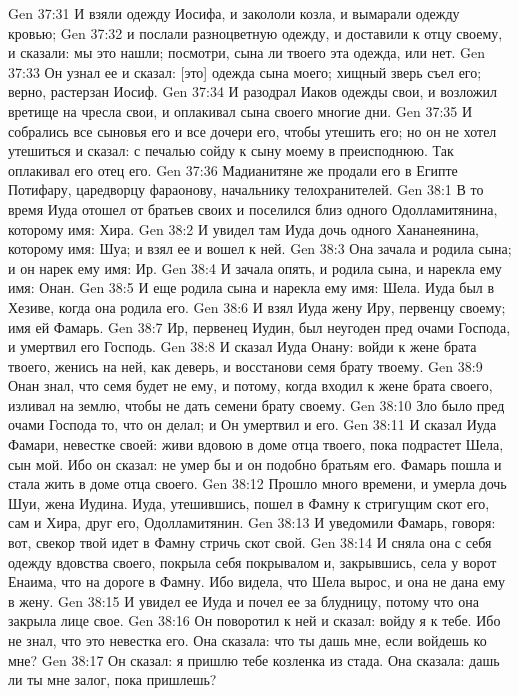 Gen 37:31  И взяли одежду Иосифа, и закололи козла, и вымарали одежду кровью;
Gen 37:32  и послали разноцветную одежду, и доставили к отцу своему, и сказали: мы это нашли; посмотри, сына ли твоего эта одежда, или нет.
Gen 37:33  Он узнал ее и сказал: [это] одежда сына моего; хищный зверь съел его; верно, растерзан Иосиф.
Gen 37:34  И разодрал Иаков одежды свои, и возложил вретище на чресла свои, и оплакивал сына своего многие дни.
Gen 37:35  И собрались все сыновья его и все дочери его, чтобы утешить его; но он не хотел утешиться и сказал: с печалью сойду к сыну моему в преисподнюю. Так оплакивал его отец его.
Gen 37:36  Мадианитяне же продали его в Египте Потифару, царедворцу фараонову, начальнику телохранителей.
Gen 38:1  В то время Иуда отошел от братьев своих и поселился близ одного Одолламитянина, которому имя: Хира.
Gen 38:2  И увидел там Иуда дочь одного Хананеянина, которому имя: Шуа; и взял ее и вошел к ней.
Gen 38:3  Она зачала и родила сына; и он нарек ему имя: Ир.
Gen 38:4  И зачала опять, и родила сына, и нарекла ему имя: Онан.
Gen 38:5  И еще родила сына и нарекла ему имя: Шела. Иуда был в Хезиве, когда она родила его.
Gen 38:6  И взял Иуда жену Иру, первенцу своему; имя ей Фамарь.
Gen 38:7  Ир, первенец Иудин, был неугоден пред очами Господа, и умертвил его Господь.
Gen 38:8  И сказал Иуда Онану: войди к жене брата твоего, женись на ней, как деверь, и восстанови семя брату твоему.
Gen 38:9  Онан знал, что семя будет не ему, и потому, когда входил к жене брата своего, изливал на землю, чтобы не дать семени брату своему.
Gen 38:10  Зло было пред очами Господа то, что он делал; и Он умертвил и его.
Gen 38:11  И сказал Иуда Фамари, невестке своей: живи вдовою в доме отца твоего, пока подрастет Шела, сын мой. Ибо он сказал: не умер бы и он подобно братьям его. Фамарь пошла и стала жить в доме отца своего.
Gen 38:12  Прошло много времени, и умерла дочь Шуи, жена Иудина. Иуда, утешившись, пошел в Фамну к стригущим скот его, сам и Хира, друг его, Одолламитянин.
Gen 38:13  И уведомили Фамарь, говоря: вот, свекор твой идет в Фамну стричь скот свой.
Gen 38:14  И сняла она с себя одежду вдовства своего, покрыла себя покрывалом и, закрывшись, села у ворот Енаима, что на дороге в Фамну. Ибо видела, что Шела вырос, и она не дана ему в жену.
Gen 38:15  И увидел ее Иуда и почел ее за блудницу, потому что она закрыла лице свое.
Gen 38:16  Он поворотил к ней и сказал: войду я к тебе. Ибо не знал, что это невестка его. Она сказала: что ты дашь мне, если войдешь ко мне?
Gen 38:17  Он сказал: я пришлю тебе козленка из стада. Она сказала: дашь ли ты мне залог, пока пришлешь?
